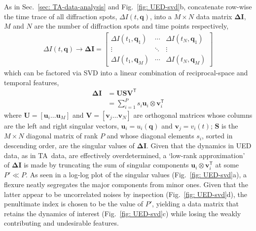 As in Sec.~\ref{sec: TA-data-analysis} and Fig.~\ref{fig: UED-svd}b, concatenate row-wise
the time trace of all diffraction spots, $\Delta I (t, \boldsymbol{q})$,
into a $M \times N$ data matrix $\mathbf{\Delta I}$,
$M$ and $N$ are the number of diffraction spots and time points respectively,
%
\begin{equation}
  \begin{aligned}
    \Delta I(t, \boldsymbol{q}) \rightarrow \mathbf{\Delta I} =
    \begin{bmatrix}
        \Delta I(t_1, \boldsymbol{q}_1) & \cdots & \Delta I(t_N, \boldsymbol{q}_1) \\
        \vdots & \ddots & \vdots \\
        \Delta I(t_1, \boldsymbol{q}_M) & \cdots & \Delta I(t_N, \boldsymbol{q}_M)
    \end{bmatrix}
  \end{aligned}
\end{equation}
%
which can be factored via SVD into a linear combination of reciprocal-space and temporal features,
%
\begin{equation}
  \begin{aligned}
    \mathbf{\Delta I} & = \mathbf{U} \mathbf{S} \mathbf{V}^\mathsf{T} \\
      & = \sum_{i = 1}^P s_i \mathbf{u}_i \otimes \mathbf{v}_i^\mathsf{T}
    \label{eq: UED-SVD}
  \end{aligned}
\end{equation}
%
where $\mathbf{U} = \left[ \mathbf{u}_i \ldots \mathbf{u}_M \right]$
and $\mathbf{V} = \left[ \mathbf{v}_j \ldots \mathbf{v}_N \right]$ are orthogonal matrices
whose columns are the left and right singular vectors,
$\mathbf{u}_i = u_i(\boldsymbol{q})$ and $\mathbf{v}_j = v_i(t)$;
$\mathbf{S}$ is the $M \times N$ diagonal matrix of rank $P$ and whose diagonal elements $s_i$,
sorted in descending order, are the singular values of $\mathbf{\Delta I}$.
%
Given that the dynamics in UED data, as in TA~data, are effectively overdetermined,
a `low-rank approximation' of $\mathbf{\Delta I}$ is made
by truncating the sum of singular components $\mathbf{u}_i \otimes \mathbf{v}_i^\mathsf{T}$
at some $P' \ll P$.
As seen in a log-log plot of the singular values (Fig.~\ref{fig: UED-svd}a),
a flexure neatly segregates the major components from minor ones.
Given that the latter appear to be uncorrelated noises by inspection (Fig.~\ref{fig: UED-svd}d),
the penultimate index is chosen to be the value of $P'$,
yielding a data matrix that retains the dynamics of interest (Fig.~\ref{fig: UED-svd}c)
while losing the weakly contributing and undesirable features.

